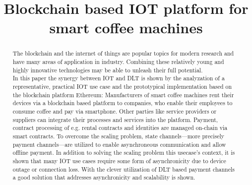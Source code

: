\documentclass[conference]{IEEEtran}
\begin{document}
\title{Blockchain based IOT platform for smart coffee machines\\
}

\author{

  \and


  \and

}

\maketitle

\begin{abstract}
  The blockchain and the internet of things are popular topics for modern research and have many areas of application in industry. Combining these relatively young and highly innovative technologies may be able to unleash their full potential.\\
  In this paper the synergy between IOT and DLT is shown by the analyzation of a representative, practical IOT use case and the prototypical implementation based on the blockchain platform Ethereum: Manufacturers of smart coffee machines rent their devices via a blockchain based platform to companies, who enable their employees to consume coffee and pay via smartphone. Other parties like service providers or suppliers can integrate their processes and services into the platform. Payment, contract processing of e.g. rental contracts and identities are managed on-chain via smart contracts. To overcome the scaling problem, state channels---more precisely payment channels---are utilized to enable asynchroneous communication and allow offline payment. In addition to solving the scaling problem this usecase's context, it is shown that many IOT use cases require some form of asynchronicity due to device outage or connection loss. With the clever utilization of DLT based payment channels a good solution that addresses asynchronicity and scalability is shown.\\

\end{abstract}
\end{document}
